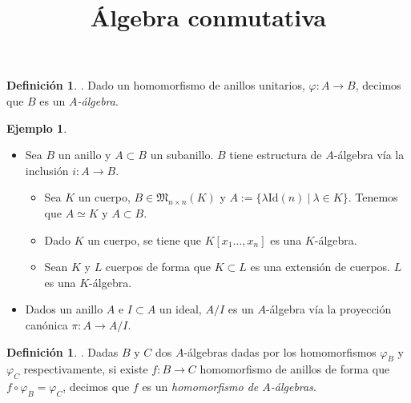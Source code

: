 \documentclass[a4paper,12pt]{article}
\theoremstyle{definition}
\newtheorem{definition}[theorem]{Definición}
\newtheorem{example}[theorem]{Ejemplo}
\begin{document}
\title{Álgebra conmutativa}
\author{}
\date{}
\maketitle

\begin{definition}. Dado un homomorfismo de anillos unitarios, $\varphi: A\longrightarrow B$, decimos que $B$ es un \textit{$A$-álgebra}.
\end{definition}

\begin{example}\begin{itemize}
    \item[1)]Sea $B$ un anillo y $A\subset B$ un subanillo. $B$ tiene estructura de $A$-álgebra vía la inclusión $i: A\longrightarrow B$.\begin{itemize}
        \item[1.1)]Sea $K$ un cuerpo, $B\in\mathfrak{M}_{n\times n}(K)$ y $A:=\{\lambda\text{Id}(n)\ |\ \lambda\in K\}$. Tenemos que $A\simeq K$ y $A\subset B$.
        \item[1.2)] Dado $K$ un cuerpo, se tiene que $K[x_1\dots,x_n]$ es una $K$-álgebra.
        \item[1.3)] Sean $K$ y $L$ cuerpos de forma que $K\subset L$ es una extensión de cuerpos. $L$ es una $K$-álgebra.
    \end{itemize}
    \item[2)] Dados un anillo $A$ e $I\subset A$ un ideal, $A/I$ es un $A$-álgebra vía la proyección canónica $\pi: A\longrightarrow A/I$.
\end{itemize}
\end{example}

\begin{definition}. Dadas $B$ y $C$ dos $A$-álgebras dadas por los homomorfismos $\varphi_B$ y $\varphi_C$ respectivamente, si existe $f: B\longrightarrow C$ homomorfismo de anillos de forma que $f\circ \varphi_B=\varphi_C$, decimos que $f$ es un \textit{homomorfismo de $A$-álgebras}.
\end{definition}
\end{document}

